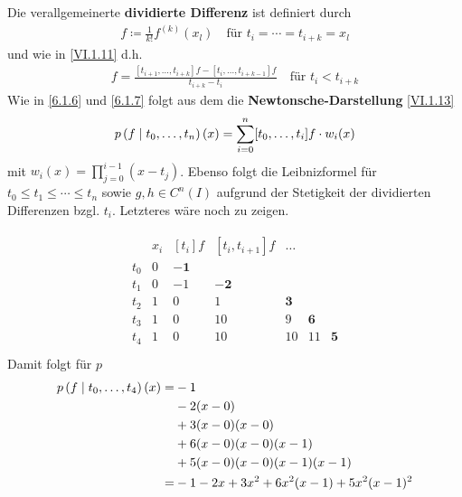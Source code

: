 \begin{Defe}
  Die verallgemeinerte \textbf{dividierte Differenz}
  ist definiert durch 
  \begin{gather*}
    [t_i,\dotsc, t_{i+k}]f \coloneqq \frac{1}{k!} f^{(k)}(x_l)
    \quad \text{für } t_i=\dotsb = t_{i+k}=x_l 
  \end{gather*}
  und wie in \eqref{VI.1.11} d.h.
  \begin{gather*}
    [t_i,\dotsc, t_{i+k}]f = \frac{[t_{i+1},\dotsc, t_{i+k}]f
      - [t_i,\dotsc,t_{i+k-1}]f}
    {t_{i+k}-t_i}
    \quad \text{für } t_i<t_{i+k}
  \end{gather*}
  Wie in \ref{6.1.6} und \ref{6.1.7} folgt aus dem 
  die \textbf{Newtonsche-Darstellung} \eqref{VI.1.13}
  \begin{gather*}
    p\left( f \mid t_0,\dotsc,t_n \right)(x) = \sum_{i=0}^{n}[t_0,\dotsc,t_i]f\cdot w_i(x) 
  \end{gather*}
  mit $w_i(x) =\prod_{j=0}^{i-1}(x-t_j)$.
  Ebenso folgt die Leibnizformel für $t_0\leq t_1\leq\dotsb\leq t_n$
  sowie $g,h\in C^n(I)$ aufgrund der Stetigkeit
  der dividierten Differenzen bzgl. $t_i$.
  Letzteres wäre noch zu zeigen.
\end{Defe}


\begin{Bspe}\label{6.1.16}
  \begin{align*}
    \begin{array}{ccccccc}
      &   x_i& [t_i]f & [t_i,t_{i+1}]f &\dots \\
      t_0 &0 & \boldsymbol{-1} \\
      t_1 &0 & -1 & \boldsymbol{-2}\\ 
      t_2 &1 & 0  & 1  &\boldsymbol{3} \\
      t_3 &1 & 0  & 10 &9  &\boldsymbol{6} \\
      t_4 &1 & 0  & 10 &10 &11 & \boldsymbol{5}
    \end{array}\\
  \end{align*}
  Damit folgt für $p$
  \begin{align*}
    p\left( f \mid t_0,\dotsc,t_4 \right)(x) 
    =& -1\\
     &-2(x-0)\\
     & +3(x-0)(x-0)\\
     & +6(x-0)(x-0)(x-1)\\
     & +5(x-0)(x-0)(x-1)(x-1)\\
    =&-1-2x+3x^2+6x^2(x-1)+5x^2(x-1)^2
  \end{align*}
\end{Bspe}

